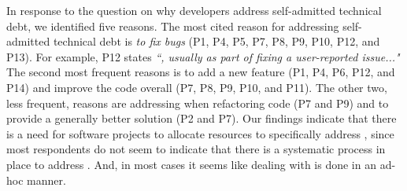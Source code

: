 In response to the question on why developers address self-admitted technical debt, we identified five reasons. The most cited reason for addressing self-admitted technical debt is \emph{to fix bugs} (P1, P4, P5, P7, P8, P9, P10, P12, and P13). For example, P12 states \textit{``, usually as part of fixing a user-reported issue..."} The second most frequent reasons is to add a new feature (P1, P4, P6, P12, and P14) and improve the code overall (P7, P8, P9, P10, and P11). The other two, less frequent, reasons are addressing \SATD when refactoring code (P7 and P9) and to provide a generally better solution (P2 and P7). Our findings indicate that there is a need for software projects to allocate resources to specifically address \SATD, since most respondents do not seem to indicate that there is a systematic process in place to address \SATD. And, in most cases it seems like dealing with \SATD is done in an ad-hoc manner.



 

 
 
 